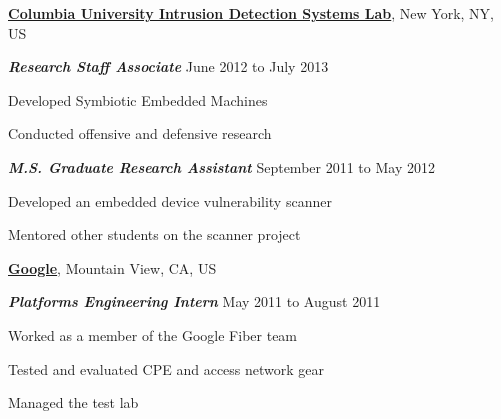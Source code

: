\documentclass[10pt]{article}
\newenvironment{outerlist}[1][\enskip\textbullet]%
        {\begin{itemize}[#1]}{\end{itemize}%
         \vspace{-.6\baselineskip}}
\newenvironment{innerlist}[1][\enskip\textbullet]%
        {\begin{compactitem}[#1]}{\end{compactitem}}
\newcommand{\blankline}{\quad\pagebreak[2]}
\begin{document}
\blankline

\href{http://ids.cs.columbia.edu}{\textbf{Columbia University Intrusion Detection Systems Lab}},
New York, NY, US
\begin{outerlist}
\item[] \textit{\textbf{Research Staff Associate}}
  \hfill June 2012 to July 2013
  \begin{innerlist}
  \item Developed Symbiotic Embedded Machines
  \item Conducted offensive and defensive research
  \end{innerlist}

\item[] \textit{\textbf{M.S. Graduate Research Assistant}}
  \hfill September 2011 to May 2012
  \begin{innerlist}
  \item Developed an embedded device vulnerability scanner
  \item Mentored other students on the scanner project
  \end{innerlist}
\end{outerlist}

\blankline

\href{https://www.google.com}{\textbf{Google}},
Mountain View, CA, US
\begin{outerlist}
\item[] \textit{\textbf{Platforms Engineering Intern}}
  \hfill May 2011 to August 2011
  \begin{innerlist}
  \item Worked as a member of the Google Fiber team
  \item Tested and evaluated CPE and access network gear
  \item Managed the test lab
  \end{innerlist}
\end{outerlist}

\blankline
\end{document}
